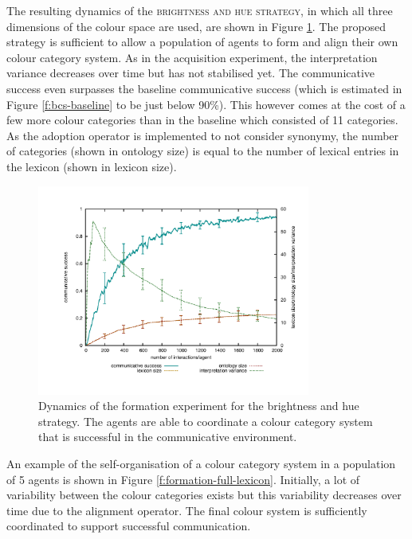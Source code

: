 The resulting dynamics of the \textsc{brightness and hue strategy}, in
which all three dimensions of the colour space are used, are shown in
Figure \ref{f:formation-full-dynamics}. The proposed strategy is
sufficient to allow a population of agents to form and align their own
colour category system. As in the acquisition experiment, the
interpretation variance decreases over time but has not stabilised
yet. The communicative success even surpasses the baseline
communicative success (which is estimated in Figure
\ref{f:bcs-baseline} to be just below 90\%). This however comes at the
cost of a few more colour categories than in the baseline which
consisted of 11 categories. As the adoption operator is implemented to
not consider synonymy, the number of categories (shown in ontology
size) is equal to the number of lexical entries in the lexicon (shown
in lexicon size).

\begin{figure}[htpb]
  \begin{center}
    \includegraphics[width=0.8\textwidth]{./basic-operators/figures/formation-full.pdf}
    \caption[Dynamics of the formation experiment for the brightness
    and hue strategy]{Dynamics of the formation experiment for the
      brightness and hue strategy. The agents are able to coordinate a
      colour category system that is successful in the communicative
      environment.}
    \label{f:formation-full-dynamics}
  \end{center}
\end{figure}

An example of the self-organisation of a colour category system in a
population of 5 agents is shown in Figure
\ref{f:formation-full-lexicon}. Initially, a lot of variability
between the colour categories exists but this variability decreases
over time due to the alignment operator. The final colour system is
sufficiently coordinated to support successful communication.

